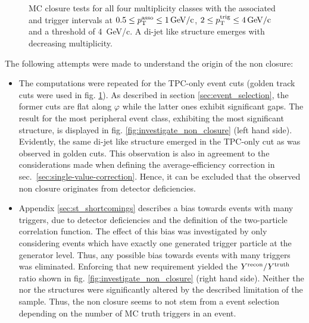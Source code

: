\begin{figure}
\begin{subfigure}[b]{0.5\textwidth}
  \end{subfigure}
  \caption[MC closure tests for all four multiplicity classes.]{MC closure tests for all four multiplicity classes with the associated and trigger intervals at $0.5 \le p_{\text{T}}^{\text{asso}} \le \SI{1}{GeV/c}$, $2 \le p_{\text{T}}^{\text{trig}} \le \SI{4}{GeV/c}$ and a threshold of \SI{4}{GeV/c}. A di-jet like structure emerges with decreasing multiplicity.}
  \label{fig:closure_structure_w_threshold}
\end{figure}

The following attempts were made to understand the origin of the non closure:

\begin{itemize}
 \item The computations were repeated for the \gls{TPC-only} event cuts (\gls{golden} track cuts were used in fig. \ref{fig:closure_structure_w_threshold}). As described in section \ref{sec:event_selection}, the former cuts are flat along $\varphi$ while the latter ones exhibit significant gaps. The result for the most peripheral event class, exhibiting the most significant structure, is displayed in fig. \ref{fig:investigate_non_closure} (left hand side). Evidently, the same \gls{di-jet} like structure emerged in the \gls{TPC-only} cut as was observed in \gls{golden} cuts. This observation is also in agreement to the considerations made when defining the average-efficiency correction in sec.~\ref{sec:single-value-correction}. Hence, it can be excluded that the observed non closure originates from detector deficiencies.
 \item Appendix \ref{sec:st_shortcomings} describes a bias towards events with many triggers, due to detector deficiencies and the definition of the two-particle correlation function. The effect of this bias was investigated by only considering events which have exactly one generated trigger particle at the generator level. Thus, any possible bias towards events with many triggers was eliminated. Enforcing that new requirement yielded the $Y^{\text{recon}} / Y^{\text{truth}}$ ratio shown in fig. \ref{fig:investigate_non_closure} (right hand side). Neither the \deta nor the \dphi structures were significantly altered by the described limitation of the sample. Thus, the non closure seems to not stem from a event selection depending on the number of MC truth triggers in an event. 
\end{itemize}

